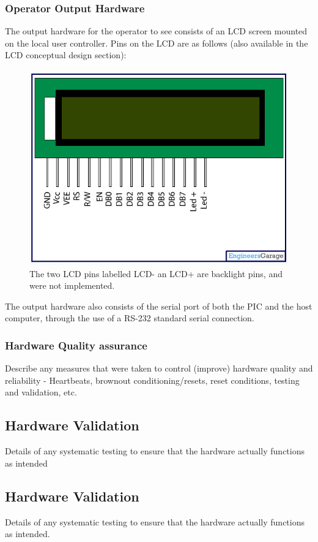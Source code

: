 \documentclass[]{report}
\begin{document}
\subsubsection{Operator Output Hardware}
The output hardware for the operator to see consists of an LCD screen mounted on the local user controller. Pins on the LCD are as follows (also available in the LCD conceptual design section):

\begin{figure}[h]
\centering
\includegraphics[width=0.7\linewidth]{"../Diagrams/LcdPins"}
\caption[LCDPinDiagram]{The two LCD pins labelled LCD- an LCD+ are backlight pins, and were not implemented.}
\label{fig:LCDPinDiagram}
\end{figure}

The output hardware also consists of the serial port of both the PIC and the host computer, through the use of a RS-232 standard serial connection.


\subsubsection{Hardware Quality assurance}
Describe any measures that were taken to control (improve) hardware quality and reliability - Heartbeats, brownout conditioning/resets, reset conditions, testing and validation, etc.

\subsection{Hardware Validation}
Details of any systematic testing to ensure that the hardware actually functions as intended

\subsection{Hardware Validation}
Details of any systematic testing to ensure that the hardware actually functions as intended.
\end{document}
